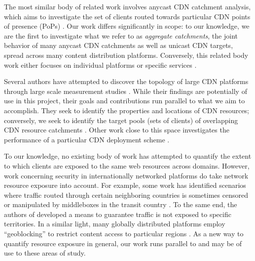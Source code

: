 The most similar body of related work involves anycast CDN catchment analysis, which aims to
investigate the set of clients routed towards particular CDN points of presence (PoPs)
\cite{anycast, anycastvsddos, vdmscatchment}. Our work differs significantly in scope: to our 
knowledge, we are the first to investigate what we refer to as \emph{aggregate catchments}, the joint
behavior of many anycast CDN catchments as well as unicast CDN targets, spread across many content
distribution platforms. Conversely, this related body work either focuses on individual platforms or
specific services \cite{anycast, anycastvsddos, vdmscatchment}. 

Several authors have attempted to discover the topology of large CDN platforms through large scale
measurement studies \cite{webcart, Calder2013, benson11}. While their findings are potentially of
use in this project, their goals and contributions run parallel to what we aim to accomplish. They
seek to identify the properties and locations of CDN resources; conversely, we seek to identify the
target pools (sets of clients) of overlapping CDN resource catchments \cite{webcart, Calder2013,
benson11}. Other work close to this space investigates the performance of a particular CDN
deployment scheme \cite{ecs15sigcomm}.

To our knowledge, no existing body of work has attempted to quantify the extent
to which clients are exposed to the same web resources across domains.  However,
work concerning security in internationally networked platforms do take network
resource exposure into account. For example, some work has identified scenarios
where traffic routed through certain neighboring countries is sometimes censored
or manipulated by middleboxes in the transit country \cite{Anonymous:2012}. To the same end, the
authors of \cite{Edmundson:2016} developed a means to guarantee traffic is not exposed to
specific territories. In a similar light, many globally distributed platforms
employ ``geoblocking'' to restrict content access to particular regions \cite{McDonald:2018}. As
a new way to quantify resource exposure in general, our work runs parallel to and may
be of use to these areas of study.
